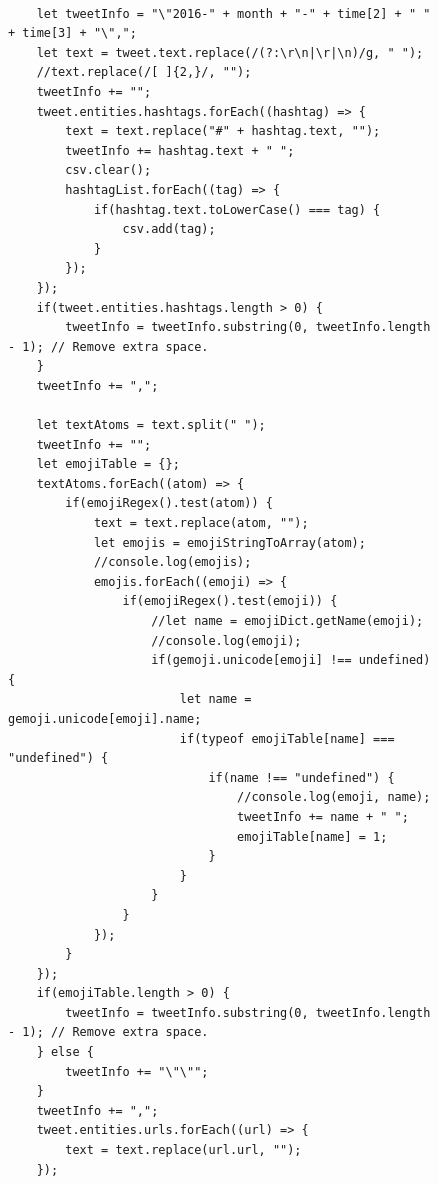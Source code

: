\documentclass[prodmode]{acmsmall} %
\begin{document}
\begin{figure}[!t]
    \begin{lstlisting}

    let tweetInfo = "\"2016-" + month + "-" + time[2] + " " + time[3] + "\",";
    let text = tweet.text.replace(/(?:\r\n|\r|\n)/g, " ");
    //text.replace(/[ ]{2,}/, "");
    tweetInfo += "";
    tweet.entities.hashtags.forEach((hashtag) => {
        text = text.replace("#" + hashtag.text, "");
        tweetInfo += hashtag.text + " ";
        csv.clear();
        hashtagList.forEach((tag) => {
            if(hashtag.text.toLowerCase() === tag) {
                csv.add(tag);
            }
        });
    });
    if(tweet.entities.hashtags.length > 0) {
        tweetInfo = tweetInfo.substring(0, tweetInfo.length - 1); // Remove extra space.
    }
    tweetInfo += ",";

    let textAtoms = text.split(" ");
    tweetInfo += "";
    let emojiTable = {};
    textAtoms.forEach((atom) => {
        if(emojiRegex().test(atom)) {
            text = text.replace(atom, "");
            let emojis = emojiStringToArray(atom);
            //console.log(emojis);
            emojis.forEach((emoji) => {
                if(emojiRegex().test(emoji)) {
                    //let name = emojiDict.getName(emoji);
                    //console.log(emoji);
                    if(gemoji.unicode[emoji] !== undefined) {
                        let name = gemoji.unicode[emoji].name;
                        if(typeof emojiTable[name] === "undefined") {
                            if(name !== "undefined") {
                                //console.log(emoji, name);
                                tweetInfo += name + " ";
                                emojiTable[name] = 1;
                            }
                        }
                    }
                }
            });
        }
    });
    if(emojiTable.length > 0) {
        tweetInfo = tweetInfo.substring(0, tweetInfo.length - 1); // Remove extra space.
    } else {
        tweetInfo += "\"\"";
    }
    tweetInfo += ",";
    tweet.entities.urls.forEach((url) => {
        text = text.replace(url.url, "");
    });
    
\end{lstlisting}
  \end{figure}
\end{document}
